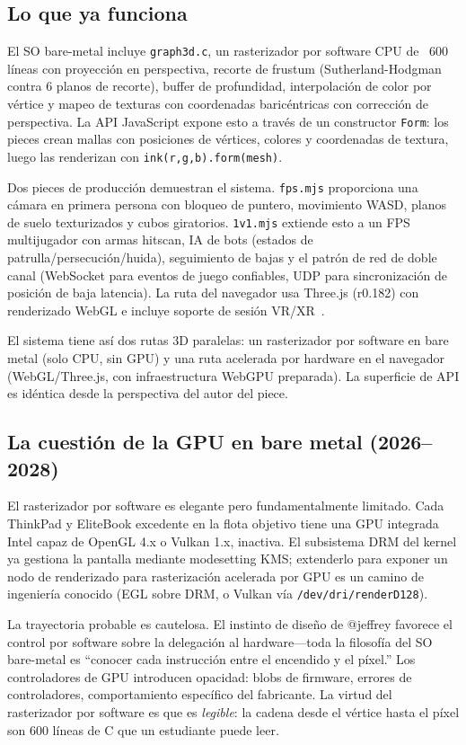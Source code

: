 \documentclass[10pt,letterpaper,twocolumn]{article}
\begin{document}
\subsection{Lo que ya funciona}

El SO bare-metal incluye \texttt{graph3d.c}, un rasterizador por software CPU de ~600 líneas con proyección en perspectiva, recorte de frustum (Sutherland-Hodgman contra 6 planos de recorte), buffer de profundidad, interpolación de color por vértice y mapeo de texturas con coordenadas baricéntricas con corrección de perspectiva. La API JavaScript expone esto a través de un constructor \texttt{Form}: los pieces crean mallas con posiciones de vértices, colores y coordenadas de textura, luego las renderizan con \texttt{ink(r,g,b).form(mesh)}.

Dos pieces de producción demuestran el sistema. \texttt{fps.mjs} proporciona una cámara en primera persona con bloqueo de puntero, movimiento WASD, planos de suelo texturizados y cubos giratorios. \texttt{1v1.mjs} extiende esto a un FPS multijugador con armas hitscan, IA de bots (estados de patrulla/persecución/huida), seguimiento de bajas y el patrón de red de doble canal (WebSocket para eventos de juego confiables, UDP para sincronización de posición de baja latencia). La ruta del navegador usa Three.js (r0.182) con renderizado WebGL e incluye soporte de sesión VR/XR~\citep{sutherland1968head}.

El sistema tiene así dos rutas 3D paralelas: un rasterizador por software en bare metal (solo CPU, sin GPU) y una ruta acelerada por hardware en el navegador (WebGL/Three.js, con infraestructura WebGPU preparada). La superficie de API es idéntica desde la perspectiva del autor del piece.

\subsection{La cuestión de la GPU en bare metal (2026--2028)}

El rasterizador por software es elegante pero fundamentalmente limitado. Cada ThinkPad y EliteBook excedente en la flota objetivo tiene una GPU integrada Intel capaz de OpenGL 4.x o Vulkan 1.x, inactiva. El subsistema DRM del kernel ya gestiona la pantalla mediante modesetting KMS; extenderlo para exponer un nodo de renderizado para rasterización acelerada por GPU es un camino de ingeniería conocido (EGL sobre DRM, o Vulkan vía \texttt{/dev/dri/renderD128}).

La trayectoria probable es cautelosa. El instinto de diseño de @jeffrey favorece el control por software sobre la delegación al hardware---toda la filosofía del SO bare-metal es ``conocer cada instrucción entre el encendido y el píxel.'' Los controladores de GPU introducen opacidad: blobs de firmware, errores de controladores, comportamiento específico del fabricante. La virtud del rasterizador por software es que es \emph{legible}: la cadena desde el vértice hasta el píxel son 600 líneas de C que un estudiante puede leer.
\end{document}
